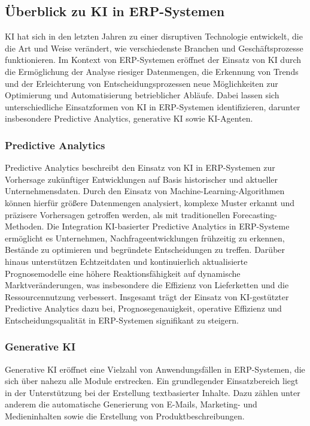 \subsection{Überblick zu KI in ERP-Systemen}
\ac{KI} hat sich in den letzten Jahren zu einer disruptiven Technologie entwickelt, die die Art und Weise verändert, wie verschiedenste Branchen und Geschäftsprozesse funktionieren. Im Kontext von \ac{ERP}-Systemen eröffnet der Einsatz von \ac{KI} durch die Ermöglichung der Analyse riesiger Datenmengen, die Erkennung von Trends und der Erleichterung von Entscheidungsprozessen neue Möglichkeiten zur Optimierung und Automatisierung betrieblicher Abläufe. \cite{fathima_impact_2024} Dabei lassen sich unterschiedliche Einsatzformen von \ac{KI} in ERP-Systemen identifizieren, darunter insbesondere Predictive Analytics, generative \ac{KI} sowie \ac{KI}-Agenten.

\subsubsection{Predictive Analytics}
Predictive Analytics beschreibt den Einsatz von \ac{KI} in \ac{ERP}-Systemen zur Vorhersage zukünftiger Entwicklungen auf Basis historischer und aktueller Unternehmensdaten. Durch den Einsatz von Machine-Learning-Algorithmen können hierfür größere Datenmengen analysiert, komplexe Muster erkannt und präzisere Vorhersagen getroffen werden, als mit traditionellen Forecasting-Methoden. Die Integration \ac{KI}-basierter Predictive Analytics in ERP-Systeme ermöglicht es Unternehmen, Nachfrageentwicklungen frühzeitig zu erkennen, Bestände zu optimieren und begründete Entscheidungen zu treffen. Darüber hinaus unterstützen Echtzeitdaten und kontinuierlich aktualisierte Prognosemodelle eine höhere Reaktionsfähigkeit auf dynamische Marktveränderungen, was insbesondere die Effizienz von Lieferketten und die Ressourcennutzung verbessert. Insgesamt trägt der Einsatz von KI-gestützter Predictive Analytics dazu bei, Prognosegenauigkeit, operative Effizienz und Entscheidungsqualität in ERP-Systemen signifikant zu steigern. \cite{fathima_impact_2024}

\subsubsection{Generative KI}
Generative \ac{KI} eröffnet eine Vielzahl von Anwendungsfällen in \ac{ERP}-Systemen, die sich über nahezu alle Module erstrecken. Ein grundlegender Einsatzbereich liegt in der Unterstützung bei der Erstellung textbasierter Inhalte. Dazu zählen unter anderem die automatische Generierung von E-Mails, Marketing- und Medieninhalten sowie die Erstellung von Produktbeschreibungen. \cite[]{sarferaz_implementing_2025}

